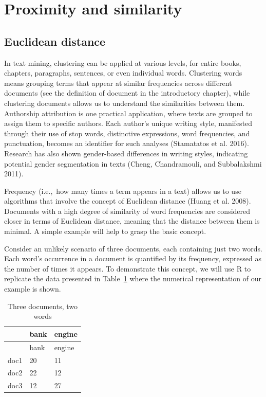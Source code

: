 \section{Proximity and similarity}\label{proximity-and-similarity}

\subsection{Euclidean distance}\label{sec-euclidean-distance}

In text mining, clustering can be applied at various levels, for
entire books, chapters, paragraphs, sentences, or even individual words.
Clustering words means grouping terms that appear at similar
frequencies across different documents (see the definition of document in
the introductory chapter), while clustering documents allows us to
understand the similarities between them. Authorship attribution is one
practical application, where texts are grouped to assign them to
specific authors. Each author's unique writing style, manifested through
their use of stop words, distinctive expressions, word frequencies, and
punctuation, becomes an identifier for such analyses (Stamatatos et al.
2016). Research has also shown gender-based differences in writing
styles, indicating potential gender segmentation in texts (Cheng,
Chandramouli, and Subbalakshmi 2011).

Frequency (i.e.,~how many times a term appears in a text) allows us
to use algorithms that involve the concept of Euclidean distance (Huang
et al. 2008). Documents with a high degree of similarity of word
frequencies are considered closer in terms of Euclidean distance,
meaning that the distance between them is minimal. A simple
example will help to grasp the basic concept.

Consider an unlikely scenario of three documents, each containing just
two words. Each word's occurrence in a document is quantified by its
frequency, expressed as the number of times it appears. To
demonstrate this concept, we will use R to replicate the data presented
in Table~\ref{tbl-firsttable} where the numerical representation of our
example is shown.

\begin{longtable}[]{@{}lll@{}}
\caption{Three documents, two
words}\label{tbl-firsttable}\tabularnewline
\toprule\noalign{}
& bank & engine \\
\midrule\noalign{}
\endfirsthead
\toprule\noalign{}
& bank & engine \\
\midrule\noalign{}
\endhead
\bottomrule\noalign{}
\endlastfoot
doc1 & 20 & 11 \\
doc2 & 22 & 12 \\
doc3 & 12 & 27 \\
\end{longtable}

